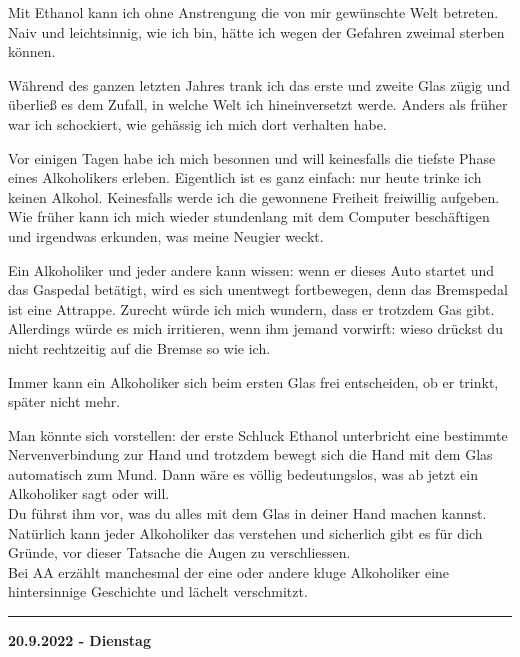 \documentclass[10pt,a4paper]{article}
\newcommand\rele[1] {{\color {english} \bf {#1}}}              %
\newcommand\ddivide {\vskip -9pt \hrule \vskip 6pt}
\begin{document}
\begin{mdframed}[style=daystyle]
\vskip 4pt
Mit Ethanol kann ich ohne Anstrengung die von mir gewünschte Welt betreten. Naiv
und leichtsinnig, wie ich bin, hätte ich wegen der Gefahren zweimal sterben
können.

\vskip 4pt
Während des ganzen letzten Jahres trank ich das erste und zweite Glas zügig
und überließ es dem Zufall, in welche Welt ich hineinversetzt werde. Anders
als früher war ich schockiert, wie gehässig ich mich dort verhalten habe.

\vskip 4pt
Vor einigen Tagen habe ich mich besonnen und will keinesfalls die tiefste
Phase eines Alkoholikers erleben. Eigentlich ist es ganz einfach: nur heute
trinke ich keinen Alkohol. Keinesfalls werde ich die gewonnene Freiheit freiwillig
aufgeben. Wie früher kann ich mich wieder stundenlang mit dem Computer
beschäftigen und irgendwas erkunden, was meine Neugier weckt.

\vskip 4pt
Ein Alkoholiker und jeder andere kann wissen: wenn er dieses Auto startet und
das Gaspedal betätigt, wird es sich unentwegt fortbewegen, denn das Bremspedal
ist eine Attrappe. Zurecht würde ich mich wundern, dass er trotzdem Gas gibt.
Allerdings würde es mich irritieren, wenn ihm jemand vorwirft: wieso drückst
du nicht rechtzeitig auf die Bremse so wie ich.

\vskip 4pt
Immer kann ein Alkoholiker sich beim ersten Glas frei entscheiden, ob er trinkt,
später nicht mehr.

\vskip 4pt
Man könnte sich vorstellen: der erste Schluck Ethanol unterbricht eine bestimmte
Nervenverbindung zur Hand und trotzdem bewegt sich die Hand mit dem Glas
automatisch zum Mund. Dann wäre es völlig bedeutungslos, was ab jetzt ein
Alkoholiker sagt oder will. \\
Du führst ihm vor, was du alles mit dem Glas in deiner Hand machen kannst.
Natürlich kann jeder Alkoholiker das verstehen und sicherlich gibt es für dich
Gründe, vor dieser Tatsache die Augen zu verschliessen. \\
Bei AA erzählt manchesmal der eine oder andere kluge Alkoholiker eine hintersinnige
Geschichte und lächelt verschmitzt.
\end{mdframed}


\vskip 4pt
\ddivide
{\rele {20.9.2022 - Dienstag}}
       
\end{document}
